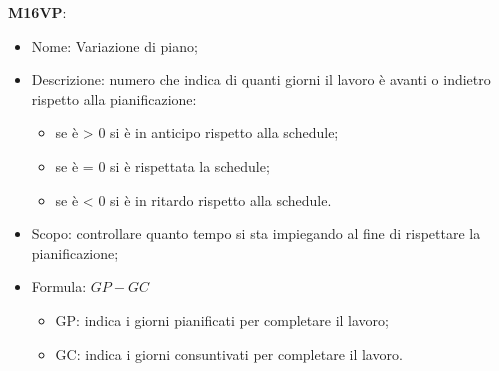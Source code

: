 \textbf{M16VP}:
\begin{itemize}
    \item Nome: Variazione di piano;
    \item Descrizione: numero che indica di quanti giorni il lavoro è avanti o indietro rispetto alla 
    pianificazione:
         \begin{itemize}
            \item se è > 0 si è in anticipo rispetto alla schedule;
            \item se è = 0 si è rispettata la schedule;
            \item se è < 0 si è in ritardo rispetto alla schedule.
        \end{itemize}
    \item Scopo: controllare quanto tempo si sta impiegando al fine di rispettare la pianificazione;
    \item Formula: $ GP - GC $
        \begin{itemize}
            \item GP: indica i giorni pianificati per completare il lavoro;
            \item GC: indica i giorni consuntivati per completare il lavoro.
        \end{itemize}
\end{itemize}